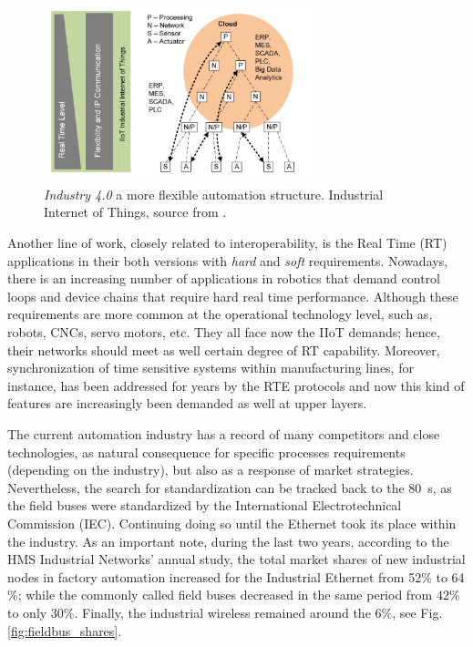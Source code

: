 \begin{figure}[h]
    \centering
    \includegraphics[width=0.7\textwidth]{imgs/intro-industryarchitecture.jpg}
    \caption{\emph{Industry 4.0} a more flexible automation structure. Industrial Internet of Things, source from \cite{tsn_intro}.}
    \label{fig:pyramid-iiot}
\end{figure}

Another line of work, closely related to interoperability, is the Real Time (RT) applications in their both versions with \emph{hard} and \emph{soft} requirements. 
Nowadays, there is an increasing number of applications in robotics that demand control loops and device chains that
require hard real time performance. Although these requirements are more common at the operational technology level, such as, robots, CNCs, servo motors, etc. 
They all face now the IIoT demands; hence, their networks should meet as well certain degree of RT capability. 
Moreover, synchronization of time sensitive
systems within manufacturing lines, for instance, has been addressed for years by the RTE protocols and now this kind of features are increasingly
been demanded as well at upper layers.

The current automation industry has a record of many competitors and close technologies, as natural consequence for specific processes requirements (depending on the industry), 
but also as a response of market strategies. Nevertheless, the search for standardization
can be tracked back to the \SI{80}{\second}, as the field buses were standardized by the International Electrotechnical Commission (IEC). 
Continuing doing so until the Ethernet took its place within the industry. As an important note, during the last two years, according to the HMS Industrial Networks' annual study,
the total market shares of new industrial nodes in factory automation increased for the Industrial Ethernet from \num{52}$\%$ to \num{64}$\%$; while the commonly called
field buses decreased in the same period from $42\%$ to only $30\%$. Finally, the industrial wireless remained around the \num{6}$\%$, see Fig.\ref{fig:fieldbus_shares}.

